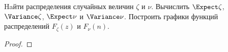 
\begin{problem}
Haйти распределения случайных величин $\zeta$ и $\nu.$ Вычислить $\Expect\zeta$, $\Variance\zeta$, $\Expect\nu$ и $\Variance\nu$. Построить графики функций распределений $F_\zeta(z)$ и $F_\nu(n).$
\end{problem}
\begin{proof}

    

    

\end{proof}